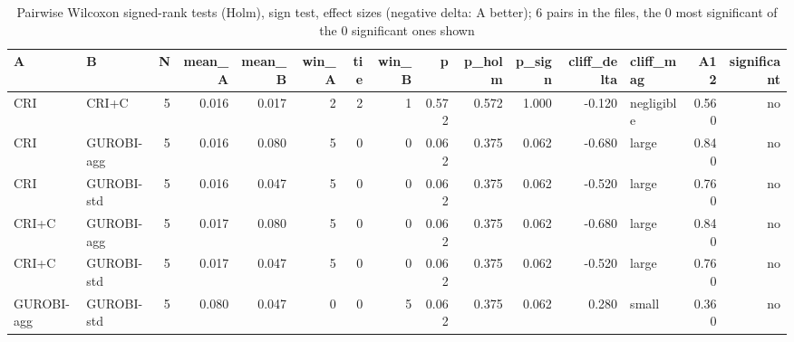 \begin{table}[htbp]
\centering
\small
\caption{Pairwise Wilcoxon signed-rank tests (Holm), sign test, effect sizes (negative delta: A better); 6 pairs in the files, the 0 most significant of the 0 significant ones shown}
\label{tab:E3x_long_runs_xlarge_b600_pairwise}
\begin{tabular}{llrrrrrrrrrrlrr}
\toprule
A & B & N & mean\_A & mean\_B & win\_A & tie & win\_B & p & p\_holm & p\_sign & cliff\_delta & cliff\_mag & A12 & significant \\
\midrule
CRI & CRI+C & 5 & 0.016 & 0.017 & 2 & 2 & 1 & 0.572 & 0.572 & 1.000 & -0.120 & negligible & 0.560 & no \\
CRI & GUROBI-agg & 5 & 0.016 & 0.080 & 5 & 0 & 0 & 0.062 & 0.375 & 0.062 & -0.680 & large & 0.840 & no \\
CRI & GUROBI-std & 5 & 0.016 & 0.047 & 5 & 0 & 0 & 0.062 & 0.375 & 0.062 & -0.520 & large & 0.760 & no \\
CRI+C & GUROBI-agg & 5 & 0.017 & 0.080 & 5 & 0 & 0 & 0.062 & 0.375 & 0.062 & -0.680 & large & 0.840 & no \\
CRI+C & GUROBI-std & 5 & 0.017 & 0.047 & 5 & 0 & 0 & 0.062 & 0.375 & 0.062 & -0.520 & large & 0.760 & no \\
GUROBI-agg & GUROBI-std & 5 & 0.080 & 0.047 & 0 & 0 & 5 & 0.062 & 0.375 & 0.062 & 0.280 & small & 0.360 & no \\
\bottomrule
\end{tabular}
\end{table}
